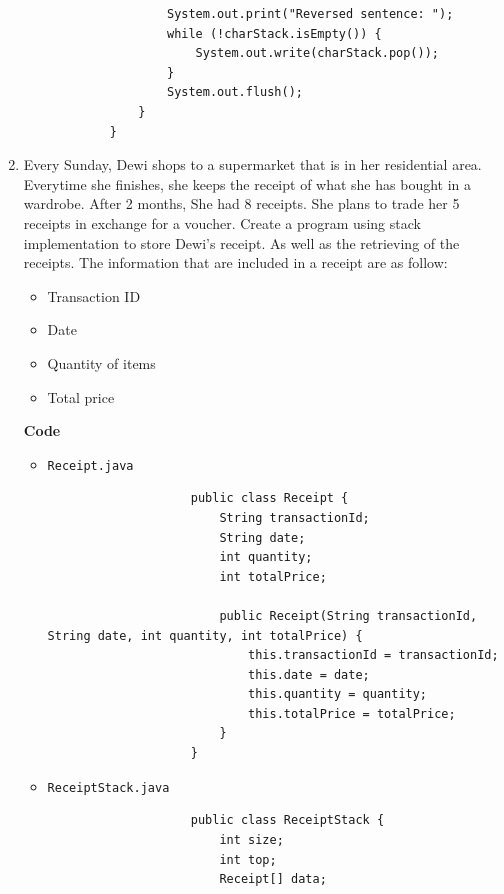 \documentclass[12pt,titlepage]{article}
\begin{document}
\begin{enumerate}
{\begin{verbatim}
                    System.out.print("Reversed sentence: ");
                    while (!charStack.isEmpty()) {
                        System.out.write(charStack.pop());
                    }
                    System.out.flush();
                }
            }
        \end{verbatim}
    }
    \item {
        Every Sunday, Dewi shops to a supermarket that is in her residential area. Everytime she
        finishes, she keeps the receipt of what she has bought in a wardrobe. After 2 months, She had 8 receipts.
        She plans to trade her 5 receipts in exchange for a voucher. Create a program using stack implementation
        to store Dewi's receipt. As well as the retrieving of the receipts. The information that are included in a receipt are as follow:

        \begin{itemize}
            \item Transaction ID
            \item Date
            \item Quantity of items
            \item Total price
        \end{itemize}

        \textbf{Code}

        \begin{itemize}
            \item {
                \texttt{Receipt.java}

                \begin{verbatim}
                    public class Receipt {
                        String transactionId;
                        String date;
                        int quantity;
                        int totalPrice;

                        public Receipt(String transactionId, String date, int quantity, int totalPrice) {
                            this.transactionId = transactionId;
                            this.date = date;
                            this.quantity = quantity;
                            this.totalPrice = totalPrice;
                        }
                    }
                \end{verbatim}
            }
            \item {
                \texttt{ReceiptStack.java}

                \begin{verbatim}
                    public class ReceiptStack {
                        int size;
                        int top;
                        Receipt[] data;


\end{verbatim}}
\end{itemize}}
\end{enumerate}
\end{document}
